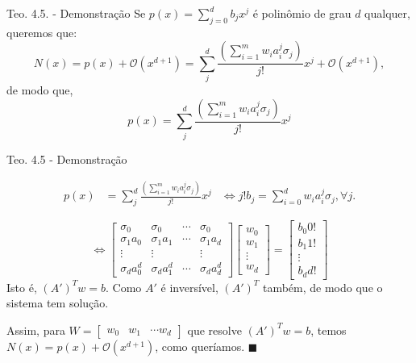 \documentclass{beamer}
\theoremstyle{definition}
\begin{document}
\begin{frame}{Teo. 4.5. - Demonstração}
    Se $p(x)=\sum_{j=0}^d b_jx^j$ é polinômio de grau $d$ qualquer, queremos que:
    \begin{equation*}
        N(x) = p(x) + \mathcal O(x^{d+1}) = \sum_j^d \frac{(\sum_{i=1}^m w_i a_i^j \sigma_j)}{j!} x^j + \mathcal O(x^{d+1}),
    \end{equation*}
    \pause
    de modo que,
    \begin{equation*}
        p(x) = \sum_j^d \frac{(\sum_{i=1}^m w_i a_i^j \sigma_j)}{j!} x^j
    \end{equation*}
\end{frame}

\begin{frame}{Teo. 4.5 - Demonstração}

    \begin{align*}
        p(x) &= \sum_j^d \frac{(\sum_{i=1}^m w_i a_i^j \sigma_j)}{j!} x^j 
        &\iff j! b_j = \sum_{i=0}^d w_i a_i^j \sigma_j, \forall j.
    \end{align*}

    \pause
    \begin{equation*}
        \iff \begin{bmatrix}
            \sigma_0 & \sigma_0 & \cdots & \sigma_0 \\
            \sigma_1 a_0 & \sigma_1 a_1 & \cdots & \sigma_1 a_d \\
            \vdots & \vdots & & \vdots \\
            \sigma_d a_0^d & \sigma_d a_1^d & \cdots & \sigma_d a_d^d
        \end{bmatrix}
        \begin{bmatrix}
            w_0 \\
            w_1 \\
            \vdots \\
            w_d
        \end{bmatrix} = \begin{bmatrix}
            b_0 0!\\
            b_1 1! \\
            \vdots \\
            b_d d!
        \end{bmatrix}
    \end{equation*} 
    \pause
    Isto é, $(A')^T w = b$. Como $A'$ é inversível, $(A')^T$ também, de modo que o sistema tem solução. \pause 
    
    \vspace{1em}

    Assim, para $W = \begin{bmatrix}
        w_0 & w_1 & \cdots w_d
    \end{bmatrix}$ que resolve $(A')^T w = b$, temos  $N(x) = p(x) + \mathcal{O}(x^{d+1})$, como queríamos. $\blacksquare$

\end{frame}
\end{document}
